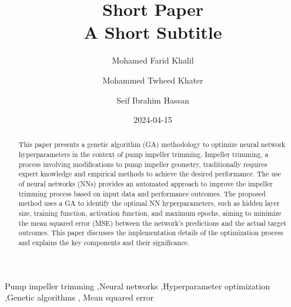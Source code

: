 \documentclass[
  super,
  review,
  3p]{elsarticle}
\date{2024-04-15}
\begin{document}
\begin{frontmatter}
\title{Short Paper \\\large{A Short Subtitle} }
\author[1]{Mohamed Farid Khalil%
%
}
\author[1]{Mohammed Twheed Khater%
%
}
\author[1]{Seif Ibrahim Hassan%
%
}



        
\begin{abstract}
This paper presents a genetic algorithm (GA) methodology to optimize
neural network hyperparameters in the context of pump impeller trimming.
Impeller trimming, a process involving modifications to pump impeller
geometry, traditionally requires expert knowledge and empirical methods
to achieve the desired performance. The use of neural networks (NNs)
provides an automated approach to improve the impeller trimming process
based on input data and performance outcomes. The proposed method uses a
GA to identify the optimal NN hyperparameters, such as hidden layer
size, training function, activation function, and maximum epochs, aiming
to minimize the mean squared error (MSE) between the network's
predictions and the actual target outcomes. This paper discusses the
implementation details of the optimization process and explains the key
components and their significance.
\end{abstract}





\begin{keyword}
    Pump impeller trimming \sep Neural networks \sep Hyperparameter
optimization \sep Genetic algorithms \sep 
    Mean squared error
\end{keyword}
\end{frontmatter}
    
\begin{nomenclature}
\begin{deflist}[AA] %

\end{deflist}
\end{nomenclature}
\end{document}
